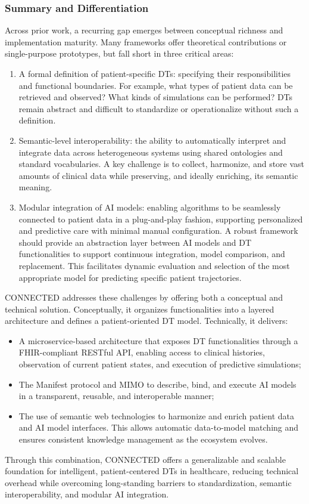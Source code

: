 \subsubsection{Summary and Differentiation}
Across prior work, a recurring gap emerges between conceptual richness and implementation maturity. Many frameworks offer theoretical contributions or single-purpose prototypes, but fall short in three critical areas:
%
\begin{enumerate}
    \item A formal definition of patient-specific DTs: specifying their responsibilities and functional boundaries. For example, what types of patient data can be retrieved and observed? What kinds of simulations can be performed? DTs remain abstract and difficult to standardize or operationalize without such a definition.
    \item Semantic-level interoperability: the ability to automatically interpret and integrate data across heterogeneous systems using shared ontologies and standard vocabularies. A key challenge is to collect, harmonize, and store vast amounts of clinical data while preserving, and ideally enriching, its semantic meaning.
    \item Modular integration of AI models: enabling algorithms to be seamlessly connected to patient data in a plug-and-play fashion, supporting personalized and predictive care with minimal manual configuration. A robust framework should provide an abstraction layer between AI models and DT functionalities to support continuous integration, model comparison, and replacement. This facilitates dynamic evaluation and selection of the most appropriate model for predicting specific patient trajectories.
\end{enumerate}
%
CONNECTED addresses these challenges by offering both a conceptual and technical solution. Conceptually, it organizes functionalities into a layered architecture and defines a patient-oriented DT model. Technically, it delivers:
%
\begin{itemize}
    \item A microservice-based architecture that exposes DT functionalities through a FHIR-compliant RESTful API, enabling access to clinical histories, observation of current patient states, and execution of predictive simulations;
    \item The Manifest protocol and MIMO to describe, bind, and execute AI models in a transparent, reusable, and interoperable manner;
    \item The use of semantic web technologies to harmonize and enrich patient data and AI model interfaces. This allows automatic data-to-model matching and ensures consistent knowledge management as the ecosystem evolves.
\end{itemize}
%
Through this combination, CONNECTED offers a generalizable and scalable foundation for intelligent, patient-centered DTs in healthcare, reducing technical overhead while overcoming long-standing barriers to standardization, semantic interoperability, and modular AI integration.

